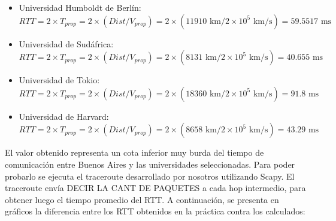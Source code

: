 \begin{itemize}
 \item Universidad Humboldt de Berlín: 
\begin{equation}
 	RTT = 2 \times T_{prop} = 2 \times (Dist / V_{prop}) = 2 \times (11910 \text{ km} / 2\times10^5 \text{ km/s}) = 59.5517  \text{ ms}
\end{equation}
 
 \item Universidad de Sudáfrica: 
 \begin{equation}
 	RTT = 2 \times T_{prop} = 2 \times (Dist / V_{prop}) = 2 \times (8131 \text{ km} / 2\times10^5 \text{ km/s}) = 40.655 \text{ ms}
 \end{equation}
 
 \item Universidad de Tokio: 
 \begin{equation}
 	RTT = 2 \times T_{prop} = 2 \times (Dist / V_{prop}) = 2 \times (18360  \text{ km} / 2\times10^5 \text{ km/s}) = 91.8 \text{ ms}
 \end{equation}
 
 \item Universidad de Harvard: 
 \begin{equation}
 	RTT = 2 \times T_{prop} = 2 \times (Dist / V_{prop}) = 2 \times (8658 \text{ km} / 2\times10^5 \text{ km/s}) = 43.29 \text{ ms}
 \end{equation}
 
\end{itemize}

El valor obtenido representa un cota inferior muy burda del tiempo de comunicación entre Buenos Aires y las universidades seleccionadas. Para poder probarlo se ejecuta el traceroute desarrollado por nosotros utilizando Scapy. El traceroute envía DECIR LA CANT DE PAQUETES a cada hop intermedio, para obtener luego el tiempo promedio del RTT. A continuación, se presenta en gráficos la diferencia entre los RTT obtenidos en la práctica contra los calculados:




